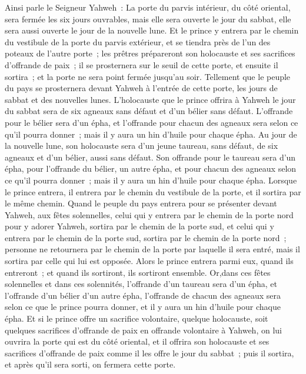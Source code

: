\begin{multicols}{2}
\VerseOne{}Ainsi parle le Seigneur Yahweh~: La porte du parvis intérieur, du côté oriental, sera fermée les six jours ouvrables, mais elle sera ouverte le jour du sabbat, elle sera aussi ouverte le jour de la nouvelle lune.
Et le prince y entrera par le chemin du vestibule de la porte du parvis extérieur, et se tiendra près de l'un des poteaux de l'autre porte~; les prêtres prépareront son holocauste et ses sacrifices d'offrande de paix~; il se prosternera sur le seuil de cette porte, et ensuite il sortira~; et la porte ne sera point fermée jusqu'au soir.
Tellement que le peuple du pays se prosternera devant Yahweh à l'entrée de cette porte, les jours de sabbat et des nouvelles lunes.
L'holocauste que le prince offrira à Yahweh le jour du sabbat sera de six agneaux sans défaut et d'un bélier sans défaut.
L'offrande pour le bélier sera d'un épha, et l'offrande pour chacun des agneaux sera selon ce qu'il pourra donner~; mais il y aura un hin d'huile pour chaque épha.
Au jour de la nouvelle lune, son holocauste sera d'un jeune taureau, sans défaut, de six agneaux et d'un bélier, aussi sans défaut.
Son offrande pour le taureau sera d'un épha, pour l'offrande du bélier, un autre épha, et pour chacun des agneaux selon ce qu'il pourra donner~; mais il y aura un hin d'huile pour chaque épha.
Lorsque le prince entrera, il entrera par le chemin du vestibule de la porte, et il sortira par le même chemin.
Quand le peuple du pays entrera pour se présenter devant Yahweh, aux fêtes solennelles, celui qui y entrera par le chemin de la porte nord pour y adorer Yahweh, sortira par le chemin de la porte sud, et celui qui y entrera par le chemin de la porte sud, sortira par le chemin de la porte nord~; personne ne retournera par le chemin de la porte par laquelle il sera entré, mais il sortira par celle qui lui est opposée.
Alors le prince entrera parmi eux, quand ils entreront~; et quand ils sortiront, ils sortiront ensemble.
Or,dans ces fêtes solennelles et dans ces solennités, l'offrande d'un taureau sera d'un épha, et l'offrande d'un bélier d'un autre épha, l'offrande de chacun des agneaux sera selon ce que le prince pourra donner, et il y aura un hin d'huile pour chaque épha.
Et si le prince offre un sacrifice volontaire, quelque holocauste, soit quelques sacrifices d'offrande de paix en offrande volontaire à Yahweh, on lui ouvrira la porte qui est du côté oriental, et il offrira son holocauste et ses sacrifices d'offrande de paix comme il les offre le jour du sabbat~; puis il sortira, et après qu'il sera sorti, on fermera cette porte.

\end{multicols}
